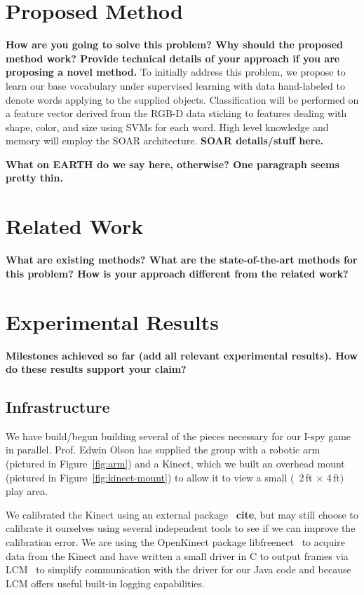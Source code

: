 \documentclass[11pt]{article}
\newcommand{\xxx}[1]{{\bf \color{red} #1}}
\begin{document}
\section{Proposed Method}
\xxx{How are you going to solve this problem? Why should the proposed method
    work? Provide technical details of your approach if you are proposing a
    novel method.}
To initially address this problem, we propose to learn our base vocabulary
under supervised learning with data hand-labeled to denote words applying to
the supplied objects. Classification will be performed on a feature vector
derived from the RGB-D data sticking to features dealing with shape, color, and
size using SVMs for each word. High level knowledge and memory will employ the
SOAR architecture. \xxx{SOAR details/stuff here.}

\xxx{What on EARTH do we say here, otherwise? One paragraph seems pretty
    thin.}

\section{Related Work}
\xxx{What are existing methods? What are the state-of-the-art methods for this
    problem? How is your approach different from the related work?}

\section{Experimental Results}
\xxx{Milestones achieved so far (add all relevant experimental results). How
    do these results support your claim?}
\subsection{Infrastructure}
We have build/begun building several of the pieces necessary for our I-spy
game in parallel.  Prof. Edwin Olson has supplied the group with a robotic
arm (pictured in Figure~\ref{fig:arm}) and a Kinect, which we built an
overhead mount (pictured in Figure~\ref{fig:kinect-mount}) to allow it to view
a small (~2\,ft $\times$ 4\,ft) play area.

We calibrated the Kinect using an external package~\xxx{cite}, but may still
choose to calibrate it ourselves using several independent tools to see if we
can improve the calibration error. We are using the OpenKinect
package libfreenect~\cite{OpenKinect} to acquire data from the Kinect and have
written a small driver in C to output frames via LCM~\cite{huang2010} to simplify
communication with the driver for our Java code and because LCM offers useful
built-in logging capabilities.
\end{document}
